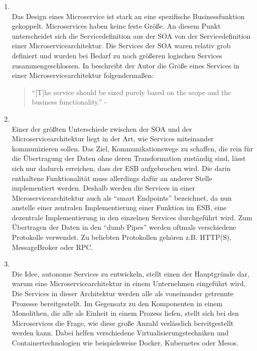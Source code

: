 \begin{definition}
	\hfill
	\begin{enumerate}
		\item {}\\
		Das Design eines Microservice ist stark an eine spezifische Businessfunktion gekoppelt.\autocite[S. 8]{microservice_enterprise} Microservices haben keine feste Größe. An diesem Punkt unterscheidet sich die Servicedefinition aus der \ac{SOA} von der Servicedefinition einer Microservicearchitektur. Die Services der \ac{SOA} waren relativ grob definiert und wurden bei Bedarf zu noch größeren logischen Services zusammengeschlossen. In  beschreibt der Autor die Größe eines Services in einer Microservicearchitektur folgendermaßen:
		\begin{quote}
			\enquote{[T]he service should be sized purely based on the scope and the business functionality.} - \citeauthor{microservice_enterprise}
		\end{quote}
		\item {}\\
		Einer der größten Unterschiede zwischen der \ac{SOA} und der Microservicearchitektur liegt in der Art, wie Services miteinander kommunizieren sollen. Das Ziel, Kommunikationswege zu schaffen, die rein für die Übertragung der Daten ohne deren Transformation zuständig sind, lässt sich nur dadurch erreichen, dass der \ac{ESB} aufgebrochen wird. Die darin enthaltene Funktionalität muss allerdings dafür an anderer Stelle implementiert werden. Deshalb werden die Services in einer Microservicearchitektur auch als \enquote{smart Endpoints} bezeichnet, da nun anstelle einer zentralen Implementierung einer Funktion im \ac{ESB}, eine dezentrale Implementierung in den einzelnen Services durchgeführt wird. Zum Übertragen der Daten in den \enquote{dumb Pipes} werden oftmals verschiedene Protokolle verwendet. Zu beliebten Protokollen gehören z.B. HTTP(S), MessageBroker oder \ac{RPC}.
		\item {}\\
		Die Idee, autonome Services zu entwickeln, stellt einen der Hauptgründe dar, warum eine Microservicearchitektur in einem Unternehmen eingeführt wird. Die Services in dieser Architektur werden alle als voneinander getrennte Prozesse bereitgestellt. Im Gegensatz zu den Komponenten in einem Monolithen, die alle als Einheit in einem Prozess liefen, stellt sich bei den Microservices die Frage, wie diese große Anzahl verlässlich bereitgestellt werden kann. Dabei helfen verschiedene Virtualisierungstechniken und Containertechnologien wie beispielsweise Docker, Kubernetes oder Mesos.

\end{enumerate}
\end{definition}

